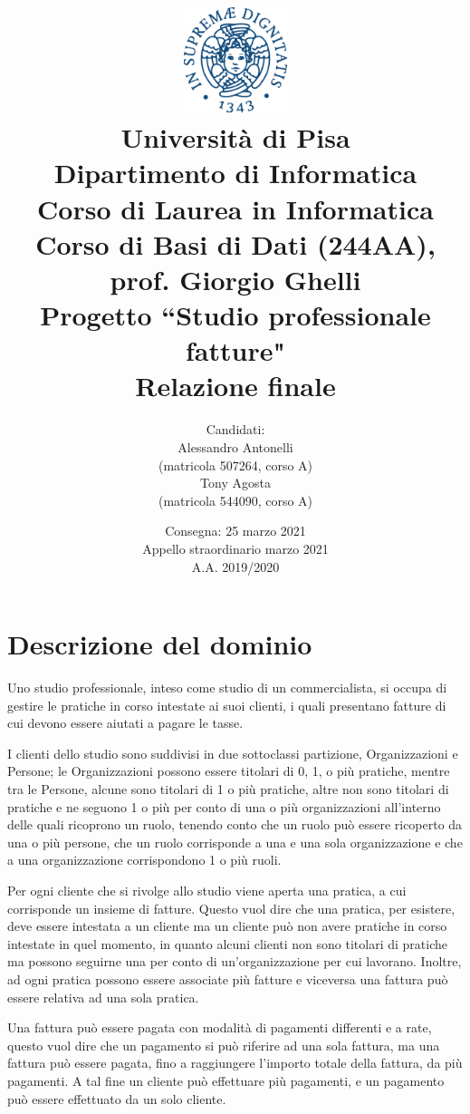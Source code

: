 \documentclass[a4paper,12pt]{article}
\title { \centering\includegraphics[width=3cm]{ Stemma_unipi.png }\\{\small Università di Pisa\\Dipartimento di Informatica\\Corso di Laurea in Informatica\\[1cm]Corso di Basi di Dati (244AA), prof. Giorgio Ghelli\\[1.5cm]}Progetto ``Studio professionale fatture"\\Relazione finale\vspace{1cm} }
\author { \vspace{0.2cm}Candidati:\\Alessandro Antonelli\\\vspace{0.3cm}(matricola 507264, corso A)\\Tony Agosta\\(matricola 544090, corso A)}
\date { \vspace{1cm}Consegna: 25 marzo 2021\\Appello straordinario marzo 2021\\A.A. 2019/2020 }
\begin{document}
 \maketitle

 \clearpage
 
 \tableofcontents

\listoffigures

\lstlistoflistings

 \clearpage
 

 \section{ Descrizione del dominio }

Uno studio professionale, inteso come studio di un commercialista, si occupa di gestire le pratiche in corso intestate ai suoi clienti, i quali presentano fatture di cui devono essere aiutati a pagare le tasse.

I clienti dello studio sono suddivisi in due sottoclassi partizione, Organizzazioni e Persone; le Organizzazioni possono essere titolari di 0, 1, o più pratiche, mentre tra le Persone, alcune sono titolari di 1 o più pratiche, altre non sono titolari di pratiche e ne seguono 1 o più per conto di una o più organizzazioni all’interno delle quali ricoprono un ruolo, tenendo conto che un ruolo può essere ricoperto da una o più persone, che un ruolo corrisponde a una e una sola organizzazione e che a una organizzazione corrispondono 1 o più ruoli.

Per ogni cliente che si rivolge allo studio viene aperta una pratica, a cui corrisponde un insieme di fatture. Questo vuol dire che una pratica, per esistere, deve essere intestata a un cliente ma un cliente può non avere pratiche in corso intestate in quel momento, in quanto alcuni clienti non sono titolari di pratiche ma possono seguirne una per conto di un’organizzazione per cui lavorano. Inoltre, ad ogni pratica possono essere associate più fatture e viceversa una fattura può essere relativa ad una sola pratica.

Una fattura può essere pagata con modalità di pagamenti differenti e a rate, questo vuol dire che un pagamento si può riferire ad una sola  fattura, ma una fattura può essere pagata, fino a raggiungere l’importo totale della fattura, da più pagamenti. A tal fine un cliente può effettuare più pagamenti, e un pagamento può essere effettuato da un solo cliente.
\end{document}
